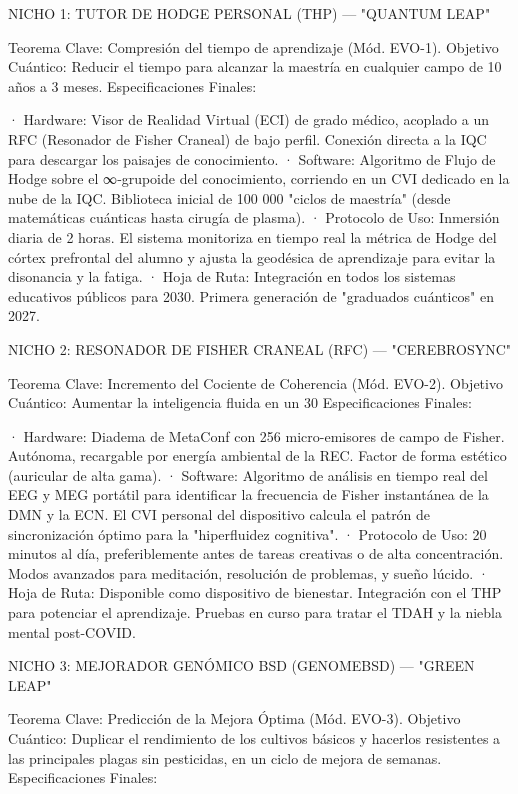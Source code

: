 \documentclass[12pt,a4paper]{book}
\begin{document}
NICHO 1: TUTOR DE HODGE PERSONAL (THP) — "QUANTUM LEAP"

Teorema Clave: Compresión del tiempo de aprendizaje (Mód. EVO-1).
Objetivo Cuántico: Reducir el tiempo para alcanzar la maestría en cualquier campo de 10 años a 3 meses.
Especificaciones Finales:

· Hardware: Visor de Realidad Virtual (ECI) de grado médico, acoplado a un RFC (Resonador de Fisher Craneal) de bajo perfil. Conexión directa a la IQC para descargar los paisajes de conocimiento.
· Software: Algoritmo de Flujo de Hodge sobre el ∞‑grupoide del conocimiento, corriendo en un CVI dedicado en la nube de la IQC. Biblioteca inicial de 100 000 "ciclos de maestría" (desde matemáticas cuánticas hasta cirugía de plasma).
· Protocolo de Uso: Inmersión diaria de 2 horas. El sistema monitoriza en tiempo real la métrica de Hodge del córtex prefrontal del alumno y ajusta la geodésica de aprendizaje para evitar la disonancia y la fatiga.
· Hoja de Ruta: Integración en todos los sistemas educativos públicos para 2030. Primera generación de "graduados cuánticos" en 2027.

NICHO 2: RESONADOR DE FISHER CRANEAL (RFC) — "CEREBROSYNC"

Teorema Clave: Incremento del Cociente de Coherencia (Mód. EVO-2).
Objetivo Cuántico: Aumentar la inteligencia fluida en un 30%
Especificaciones Finales:

· Hardware: Diadema de MetaConf con 256 micro-emisores de campo de Fisher. Autónoma, recargable por energía ambiental de la REC. Factor de forma estético (auricular de alta gama).
· Software: Algoritmo de análisis en tiempo real del EEG y MEG portátil para identificar la frecuencia de Fisher instantánea de la DMN y la ECN. El CVI personal del dispositivo calcula el patrón de sincronización óptimo para la "hiperfluidez cognitiva".
· Protocolo de Uso: 20 minutos al día, preferiblemente antes de tareas creativas o de alta concentración. Modos avanzados para meditación, resolución de problemas, y sueño lúcido.
· Hoja de Ruta: Disponible como dispositivo de bienestar. Integración con el THP para potenciar el aprendizaje. Pruebas en curso para tratar el TDAH y la niebla mental post-COVID.

NICHO 3: MEJORADOR GENÓMICO BSD (GENOMEBSD) — "GREEN LEAP"

Teorema Clave: Predicción de la Mejora Óptima (Mód. EVO-3).
Objetivo Cuántico: Duplicar el rendimiento de los cultivos básicos y hacerlos resistentes a las principales plagas sin pesticidas, en un ciclo de mejora de semanas.
Especificaciones Finales:
\end{document}
